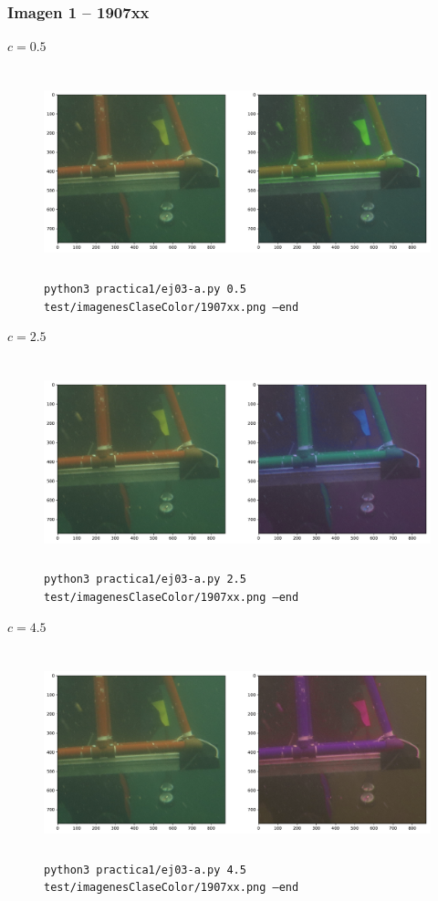 \documentclass[11pt, spanish]{article}
\begin{document}
\subsubsection*{Imagen 1 -- 1907xx}
$c = 0.5$
\begin{figure}[H]
\centering
  \includegraphics[height=6cm]{informe-imgs/ej03-1.pdf}
  \caption{\texttt{python3 practica1/ej03-a.py 0.5 test/imagenesClaseColor/1907xx.png --end}}
\end{figure}

$c = 2.5$
\begin{figure}[H]
\centering
  \includegraphics[height=6cm]{informe-imgs/ej03-2.pdf}
  \caption{\texttt{python3 practica1/ej03-a.py 2.5 test/imagenesClaseColor/1907xx.png --end}}
\end{figure}

$c = 4.5$
\begin{figure}[H]
\centering
  \includegraphics[height=6cm]{informe-imgs/ej03-3.pdf}
  \caption{\texttt{python3 practica1/ej03-a.py 4.5 test/imagenesClaseColor/1907xx.png --end}}
\end{figure}
\end{document}
